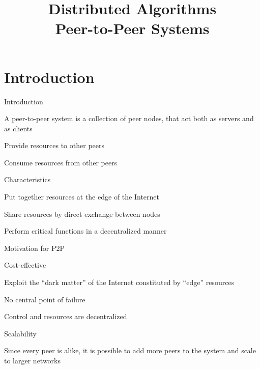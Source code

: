 
\title[DS - P2P]{\textbf{Distributed Algorithms}\\Peer-to-Peer Systems}

\graphicspath{{figs/10/}}



\newcommand{\ID}{\mathit{ID}}


\FrameContent



\section{Introduction}

\begin{frame}{Introduction}

\begin{definition}
A peer-to-peer system is a collection of \alert{peer} nodes, that act
both as servers and as clients
\BI
\item Provide resources to other peers
\item Consume resources from other peers
\EI
\end{definition}

\smallskip
\begin{block}{Characteristics}
\BI
\item Put together resources at the edge of the Internet
\item Share resources by direct exchange between nodes
\item Perform critical functions in a decentralized manner
\EI
\end{block}
\end{frame}

\begin{frame}{Motivation for P2P}

\BIL
\item \alert{Cost-effective}
	\BI
	\item Exploit the “dark matter” of the Internet constituted by “edge” resources
	\EI
\item \alert{No central point of failure}
	\BI
	\item Control and resources are decentralized
	\EI
\item \alert{Scalability}
\BI
\item Since every peer is alike, it is possible to add more peers to the system and scale to larger networks
\EI
\EIL
\end{frame}

